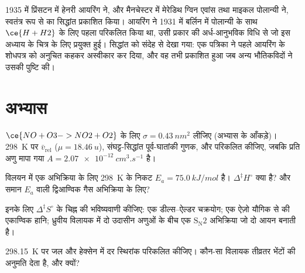 \begin{history}[आयरिंग, एवांस और पोलान्यी, 1935]
1935 में प्रिंसटन में हेनरी आयरिंग ने, और मैनचेस्टर में मेरेडिथ ग्विन एवांस तथा माइकल
पोलान्यी ने, स्वतंत्र रूप से  का सिद्धांत प्रकाशित किया। आयरिंग ने 1931 में बर्लिन में पोलान्यी के साथ $\ce{H + H2}$ के लिए पहला
 परिकलित किया था, उसी प्रकार की अर्ध-आनुभविक विधि से जो
इस अध्याय के चित्र के लिए प्रयुक्त हुई। सिद्धांत को संदेह से देखा गया: एक
पत्रिका ने पहले आयरिंग के शोधपत्र को अनुचित कहकर अस्वीकार कर दिया, और वह तभी
प्रकाशित हुआ जब अन्य भौतिकविदों ने उसकी पुष्टि की।
\end{history}

\section{अभ्यास}

\begin{exercise}[$\star$]\label{exo:b3:rate-theories:1}
$\ce{NO + O3 -> NO2 + O2}$ के लिए $\sigma = \qty{0.43}{nm^2}$ लीजिए (अभ्यास के आँकड़े)। \qty{298}{K} पर
$\bar v_{\mathrm{rel}}$ ($\mu = \qty{18.46}{u}$), संघट्ट-सिद्धांत पूर्व-घातांकी गुणक, और
 परिकलित कीजिए, जबकि प्रति अणु मापा गया $A = \qty{2.07e-12}{cm^3.s^{-1}}$ है।
\end{exercise}

\begin{exercise}[$\star$]\label{exo:b3:rate-theories:2}
विलयन में एक अभिक्रिया के लिए \qty{298}{K} के निकट $E_a = \qty{75.0}{kJ/mol}$ है। $\Delta^{\ddagger}H^\circ$ क्या है? और
समान $E_a$ वाली द्विआण्विक गैस अभिक्रिया के लिए?
\end{exercise}

\begin{exercise}[$\star$]\label{exo:b3:rate-theories:3}
इनके लिए $\Delta^{\ddagger}S^\circ$ के चिह्न की भविष्यवाणी कीजिए: एक डील्स--ऐल्डर चक्रयोग;
एक ऐज़ो यौगिक से  की एकाण्विक हानि; ध्रुवीय विलायक में दो उदासीन अणुओं के बीच
एक $\mathrm{S_N2}$ अभिक्रिया जो दो आयन बनाती है।
\end{exercise}

\begin{exercise}[$\star$]\label{exo:b3:rate-theories:4}
\qty{298.15}{K} पर जल और हेक्सेन में  दर स्थिरांक परिकलित कीजिए।
कौन-सा विलायक तीव्रतर भेंटों की अनुमति देता है, और क्यों?
\end{exercise}

